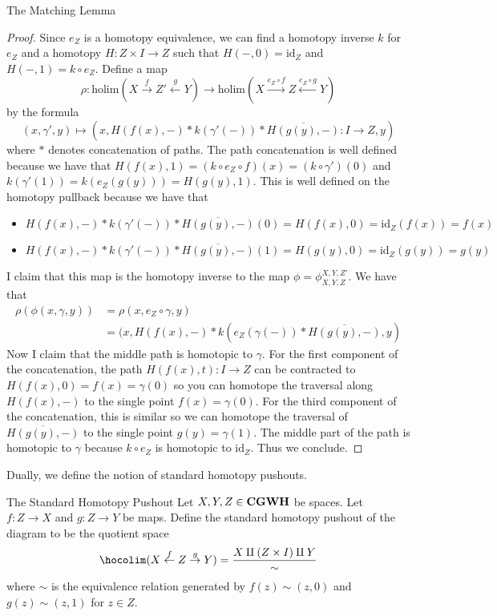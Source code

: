 \documentclass[a4paper]{article}
\begin{document}
\begin{thm}{The Matching Lemma}{}
\begin{proof}
Since $e_Z$ is a homotopy equivalence, we can find a homotopy inverse $k$ for $e_Z$ and a homotopy $H:Z\times I\to Z$ such that $H(-,0)=\text{id}_Z$ and $H(-,1)=k\circ e_Z$. Define a map $$\rho:\text{holim}(X\overset{f}{\rightarrow}Z'\overset{g}{\leftarrow}Y)\to\text{holim}(X\overset{e_Z\circ f}{\rightarrow}Z\overset{e_Z\circ g}{\leftarrow}Y)$$ by the formula $$(x,\gamma',y)\mapsto(x,H(f(x),-)\ast k(\gamma'(-))\ast\overline{H(g(y),-)}:I\to Z,y)$$ where $\ast$ denotes concatenation of paths. The path concatenation is well defined because we have that $H(f(x),1)=(k\circ e_Z\circ f)(x)=(k\circ\gamma')(0)$ and $k(\gamma'(1))=k(e_Z(g(y)))=H(g(y),1)$. This is well defined on the homotopy pullback because we have that 
\begin{itemize}
\item $H(f(x),-)\ast k(\gamma'(-))\ast\overline{H(g(y),-)}(0)=H(f(x),0)=\text{id}_Z(f(x))=f(x)$
\item $H(f(x),-)\ast k(\gamma'(-))\ast\overline{H(g(y),-)}(1)=H(g(y),0)=\text{id}_Z(g(y))=g(y)$
\end{itemize}
I claim that this map is the homotopy inverse to the map $\phi=\phi_{X,Y,Z}^{X,Y,Z'}$. We have that 
\begin{align*}
\rho(\phi(x,\gamma,y))&=\rho(x,e_Z\circ\gamma,y)\\
&=(x,H(f(x),-)\ast k(e_Z(\gamma(-))\ast\overline{H(g(y),-)},y)
\end{align*}
Now I claim that the middle path is homotopic to $\gamma$. For the first component of the concatenation, the path $H(f(x),t):I\to Z$ can be contracted to $H(f(x),0)=f(x)=\gamma(0)$ so you can homotope the traversal along $H(f(x),-)$ to the single point $f(x)=\gamma(0)$. For the third component of the concatenation, this is similar so we can homotope the traversal of $\overline{H(g(y),-)}$ to the single point $g(y)=\gamma(1)$. The middle part of the path is homotopic to $\gamma$ because $k\circ e_Z$ is homotopic to $\text{id}_Z$. Thus we conclude. 
\end{proof}
\end{thm}

Dually, we define the notion of standard homotopy pushouts. 

\begin{defn}{The Standard Homotopy Pushout}{} Let $X,Y,Z\in\bold{CGWH}$ be spaces. Let $f:Z\to X$ and $g:Z\to Y$ be maps. Define the standard homotopy pushout of the diagram to be the quotient space $$\hocolim(X\overset{f}{\leftarrow}Z\overset{g}{\rightarrow}Y)=\frac{X\amalg(Z\times I)\amalg Y}{\sim}$$ where $\sim$ is the equivalence relation generated by $f(z)\sim (z,0)$ and $g(z)\sim(z,1)$ for $z\in Z$. 
\end{defn}
\end{document}
